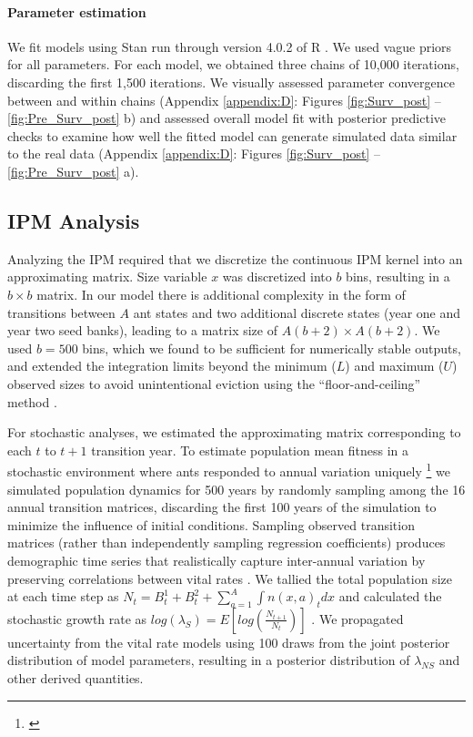 \documentclass[11pt]{article}
\newcommand{\tom}[2]{{\color{red}{#1}}\footnote{\textit{\color{red}{#2}}}}
\begin{document}
\paragraph{Parameter estimation}
We fit models using Stan run through version 4.0.2 of R \cite{Rcite,Rstancite}. 
We used vague priors for all parameters. 
For each model, we obtained three chains of 10,000 iterations, discarding the first 1,500 iterations. 
We visually assessed parameter convergence between and within chains (Appendix \ref{appendix:D}: Figures \ref{fig:Surv_post} -- \ref{fig:Pre_Surv_post} b) and assessed overall model fit with posterior predictive checks to examine how well the fitted model can generate simulated data similar to the real data (Appendix \ref{appendix:D}: Figures \ref{fig:Surv_post} -- \ref{fig:Pre_Surv_post} a).

\subsection*{IPM Analysis}
Analyzing the IPM required that we discretize the continuous IPM kernel into an approximating matrix. 
Size variable $x$ was discretized into $b$ bins, resulting in a $b \times b$ matrix.
In our model there is additional complexity in the form of transitions between $A$ ant states and two additional discrete states (year one and year two seed banks), leading to a matrix size of $A(b+2) \times A(b+2)$.
We used $b = 500$ bins, which we found to be sufficient for numerically stable outputs, and extended the integration limits beyond the minimum ($L$) and maximum ($U$) observed sizes to avoid unintentional eviction using the ``floor-and-ceiling'' method \cite{Williams2012}. 

For stochastic analyses, we estimated the approximating matrix corresponding to each $t$ to $t+1$ transition year. 
To estimate population mean fitness in a stochastic environment where ants responded to annual variation uniquely \tom{($\lambda_{NS}$)}{Let's discuss this symbology.} we simulated population dynamics for 500 years by randomly sampling among the 16 annual transition matrices, discarding the first 100 years of the simulation to minimize the influence of initial conditions. 
Sampling observed transition matrices (rather than independently sampling regression coefficients) produces demographic time series that realistically capture inter-annual variation by preserving correlations between vital rates \cite{metcalf2015statistical}.
We tallied the total population size at each time step as  $N_{t} = B^1_{t} + B^2_{t} + \sum_{a=1}^{A}\int n(x,a)_{t}dx$ and calculated the stochastic growth rate as $log(\lambda_S) = E[log(\frac{N_{t+1}}{N_{t}})]$ \citep{Mark2009}.
We propagated uncertainty from the vital rate models using 100 draws from the joint posterior distribution of model parameters, resulting in a posterior distribution of $\lambda_{NS}$ and other derived quantities.
\end{document}
